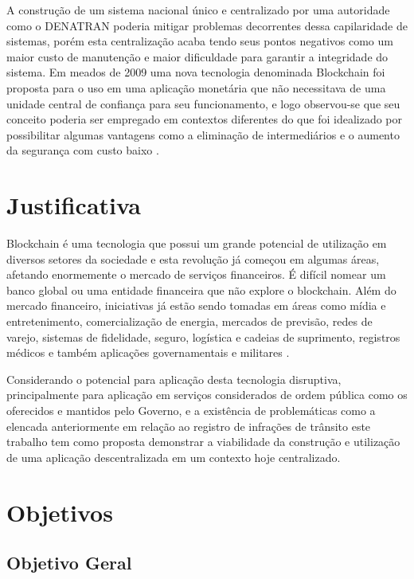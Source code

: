 A construção de um sistema nacional único e centralizado por uma autoridade como o DENATRAN poderia mitigar problemas decorrentes dessa capilaridade de sistemas, porém esta centralização acaba tendo seus pontos negativos como um maior custo de manutenção e maior dificuldade para garantir a integridade do sistema. Em meados de 2009 uma nova tecnologia denominada Blockchain foi proposta para o uso em uma aplicação monetária que não necessitava de uma unidade central de confiança para seu funcionamento, e logo observou-se que seu conceito poderia ser empregado em contextos diferentes do que foi idealizado por possibilitar algumas vantagens como a eliminação de intermediários e o aumento da segurança com custo baixo \cite{beginnig_blockchain_bikramaditya}.


\section{Justificativa}

Blockchain é uma tecnologia que possui um grande potencial de utilização em diversos setores da sociedade e esta revolução já começou em algumas áreas, afetando enormemente o mercado de serviços financeiros. É difícil nomear um banco global ou uma entidade financeira que não explore o blockchain. Além do mercado financeiro, iniciativas já estão sendo tomadas em áreas como mídia e entretenimento, comercialização de energia, mercados de previsão, redes de varejo, sistemas de fidelidade, seguro, logística e cadeias de suprimento, registros médicos e também aplicações governamentais e militares \cite{beginnig_blockchain_bikramaditya}.

Considerando o potencial para aplicação desta tecnologia disruptiva, principalmente para aplicação em serviços considerados de ordem pública como os oferecidos e mantidos pelo Governo, e a existência de problemáticas como a elencada anteriormente em relação ao registro de infrações de trânsito este trabalho tem como proposta demonstrar a viabilidade da construção e utilização de uma aplicação descentralizada em um contexto hoje centralizado.

\section{Objetivos}

    \subsection{Objetivo Geral}
    
